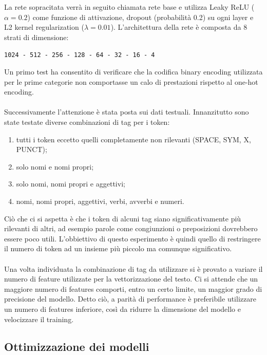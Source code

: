 La rete sopracitata verrà in seguito chiamata rete base e utilizza Leaky ReLU ($\alpha = 0.2$) come funzione di attivazione, 
dropout (probabilità 0.2) su ogni layer e L2 kernel regularization ($\lambda = 0.01$). L'architettura della rete è 
composta da 8 strati di dimensione:
\begin{center}
	{\tt 1024 - 512 - 256 - 128 - 64 - 32 - 16 - 4}
\end{center}

Un primo test ha consentito di verificare che la codifica binary encoding utilizzata per le prime
categorie non comportasse un calo di prestazioni rispetto al one-hot encoding.

\paragraph{} Successivamente l'attenzione è stata posta sui dati testuali. Innanzitutto sono 
state testate diverse combinazioni di tag per i token:
\begin{enumerate}
    \item tutti i token eccetto quelli completamente non rilevanti (SPACE, SYM, X, PUNCT);
    \item solo nomi e nomi propri;
    \item solo nomi, nomi propri e aggettivi;
    \item nomi, nomi propri, aggettivi, verbi, avverbi e numeri.
\end{enumerate}

Ciò che ci si aspetta è che i token di alcuni tag siano significativamente più rilevanti di altri, ad 
esempio parole come congiunzioni o preposizioni dovrebbero essere poco utili. L'obbiettivo di questo 
esperimento è quindi quello di restringere il numero di token ad un insieme più piccolo ma comunque significativo.

\paragraph{} Una volta individuata la combinazione di tag da utilizzare si è provato a variare il 
numero di feature utilizzate per la vettorizzazione del testo. Ci si attende che un maggiore numero di 
features comporti, entro un certo limite, un maggior grado di precisione del modello. Detto ciò, a 
parità di performance è preferibile utilizzare un numero di features inferiore, così da ridurre 
la dimensione del modello e velocizzare il training.

\subsection{Ottimizzazione dei modelli}

